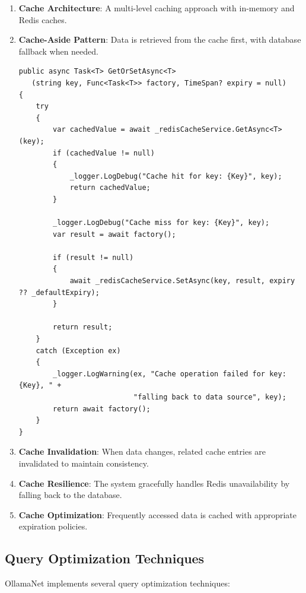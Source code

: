 \begin{enumerate}
   \item \textbf{Cache Architecture}: A multi-level caching approach with in-memory and Redis caches.

   \item \textbf{Cache-Aside Pattern}: Data is retrieved from the cache first, with database fallback when needed.

\begin{verbatim}
public async Task<T> GetOrSetAsync<T>
   (string key, Func<Task<T>> factory, TimeSpan? expiry = null)
{
    try
    {
        var cachedValue = await _redisCacheService.GetAsync<T>(key);
        if (cachedValue != null)
        {
            _logger.LogDebug("Cache hit for key: {Key}", key);
            return cachedValue;
        }

        _logger.LogDebug("Cache miss for key: {Key}", key);
        var result = await factory();
        
        if (result != null)
        {
            await _redisCacheService.SetAsync(key, result, expiry ?? _defaultExpiry);
        }
        
        return result;
    }
    catch (Exception ex)
    {
        _logger.LogWarning(ex, "Cache operation failed for key: {Key}, " +
                           "falling back to data source", key);
        return await factory();
    }
}
\end{verbatim}

   \item \textbf{Cache Invalidation}: When data changes, related cache entries are invalidated to maintain consistency.

   \item \textbf{Cache Resilience}: The system gracefully handles Redis unavailability by falling back to the database.

   \item \textbf{Cache Optimization}: Frequently accessed data is cached with appropriate expiration policies.
\end{enumerate}

\subsection{Query Optimization Techniques}

OllamaNet implements several query optimization techniques:

